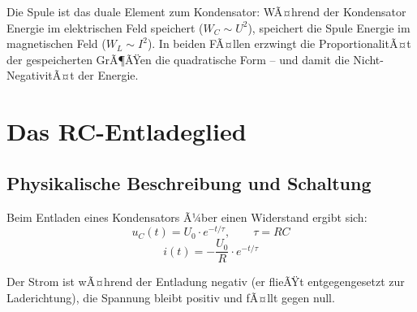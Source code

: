 ﻿\documentclass[12pt, a4paper]{article}
\begin{document}
	Die Spule ist das duale Element zum Kondensator: WÃ¤hrend der Kondensator Energie im elektrischen Feld speichert ($W_C \sim U^2$), speichert die Spule Energie im magnetischen Feld ($W_L \sim I^2$). In beiden FÃ¤llen erzwingt die ProportionalitÃ¤t der gespeicherten GrÃ¶ÃŸen die quadratische Form -- und damit die Nicht-NegativitÃ¤t der Energie.
	
	\section{Das RC-Entladeglied}
	
	\subsection{Physikalische Beschreibung und Schaltung}
	
	Beim Entladen eines Kondensators Ã¼ber einen Widerstand ergibt sich:
	\begin{equation}
		u_C(t) = U_0 \cdot e^{-t/\tau}, \qquad \tau = RC
	\end{equation}
	\begin{equation}
		i(t) = -\frac{U_0}{R} \cdot e^{-t/\tau}
	\end{equation}
	
	Der Strom ist wÃ¤hrend der Entladung negativ (er flieÃŸt entgegengesetzt zur Laderichtung), die Spannung bleibt positiv und fÃ¤llt gegen null.
	
\end{document}

